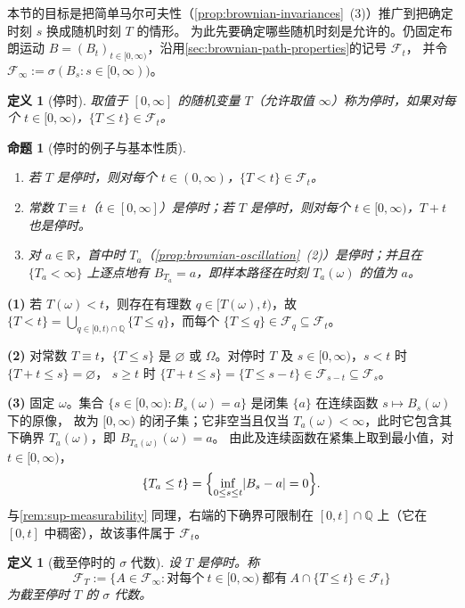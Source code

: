 \documentclass[UTF8,11pt,a4paper,oneside,fontset=fandol]{ctexrep}
\makeatletter
\numberwithin{equation}{section}
\theoremstyle{zhthm}
\newtheorem{proposition}[theorem]{命题}
\newtheorem{definition}[theorem]{定义}
\renewenvironment{proof}[1][\proofname]{\par
  \pushQED{\qed}%
  \normalfont\topsep6\p@\@plus6\p@\relax
  \trivlist
  \item[\hskip\labelsep\bfseries#1\hspace{0.5em}]\ignorespaces
}{%
  \popQED\endtrivlist\@endpefalse
}
\renewcommand{\proofname}{证明}
\newcommand{\Q}{\mathbb{Q}}
\newcommand{\R}{\mathbb{R}}
\newcommand{\F}{\mathcal{F}}
\DeclarePairedDelimiter{\abs}{\lvert}{\rvert}
\makeatother
\begin{document}
本节的目标是把简单马尔可夫性（\cref{prop:brownian-invariances}~(3)）推广到把确定时刻 $s$ 换成随机时刻 $T$ 的情形。
为此先要确定哪些随机时刻是允许的。仍固定布朗运动 $B=(B_t)_{t\in[0,\infty)}$，沿用\cref{sec:brownian-path-properties}的记号 $\F_t$，
并令 $\F_\infty:=\sigma(B_s:s\in[0,\infty))$。

\begin{definition}[停时]
\label{def:stopping-time}
取值于 $[0,\infty]$ 的随机变量 $T$（允许取值 $\infty$）称为停时，如果对每个 $t\in[0,\infty)$，$\{T\le t\}\in\F_t$。
\end{definition}

\begin{proposition}[停时的例子与基本性质]
\label{prop:stopping-time-basics}
\begin{enumerate}
  \item 若 $T$ 是停时，则对每个 $t\in(0,\infty)$，$\{T<t\}\in\F_t$。
  \item 常数 $T\equiv t$（$t\in[0,\infty]$）是停时；若 $T$ 是停时，则对每个 $t\in[0,\infty)$，$T+t$ 也是停时。
  \item 对 $a\in\R$，首中时 $T_a$（\cref{prop:brownian-oscillation}~(2)）是停时；并且在 $\{T_a<\infty\}$ 上逐点地有
    $B_{T_a}=a$，即样本路径在时刻 $T_a(\omega)$ 的值为 $a$。
\end{enumerate}
\end{proposition}

\begin{proof}
\textbf{(1)} 若 $T(\omega)<t$，则存在有理数 $q\in[T(\omega),t)$，故
$\{T<t\}=\bigcup_{q\in[0,t)\cap\Q}\{T\le q\}$，而每个 $\{T\le q\}\in\F_q\subseteq\F_t$。

\textbf{(2)} 对常数 $T\equiv t$，$\{T\le s\}$ 是 $\varnothing$ 或 $\Omega$。对停时 $T$ 及 $s\in[0,\infty)$，$s<t$ 时 $\{T+t\le s\}=\varnothing$，
$s\ge t$ 时 $\{T+t\le s\}=\{T\le s-t\}\in\F_{s-t}\subseteq\F_s$。

\textbf{(3)} 固定 $\omega$。集合 $\{s\in[0,\infty):B_s(\omega)=a\}$ 是闭集 $\{a\}$ 在连续函数 $s\mapsto B_s(\omega)$ 下的原像，
故为 $[0,\infty)$ 的闭子集；它非空当且仅当 $T_a(\omega)<\infty$，此时它包含其下确界 $T_a(\omega)$，即 $B_{T_a(\omega)}(\omega)=a$。
由此及连续函数在紧集上取到最小值，对 $t\in[0,\infty)$，
\[
  \{T_a\le t\}=\Bigl\{\inf_{0\le s\le t}\abs{B_s-a}=0\Bigr\}.
\]
与\cref{rem:sup-measurability} 同理，右端的下确界可限制在 $[0,t]\cap\Q$ 上（它在 $[0,t]$ 中稠密），故该事件属于 $\F_t$。
\end{proof}

\begin{definition}[截至停时的 $\sigma$ 代数]
\label{def:stopping-time-sigma-algebra}
设 $T$ 是停时。称
\[
  \F_T:=\bigl\{A\in\F_\infty:\text{对每个}\ t\in[0,\infty)\ \text{都有}\ A\cap\{T\le t\}\in\F_t\bigr\}
\]
为截至停时 $T$ 的 $\sigma$ 代数。
\end{definition}
\end{document}
